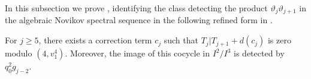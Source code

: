 

In this subsection we prove , identifying the class detecting the product $\vartheta_j\vartheta_{j+1}$ in the algebraic Novikov spectral sequence in the following refined form in .

\begin{lem} \label{lem:prod-big}
  For $j \geq 5$, there exists a correction term $c_j$ such that $T_j|T_{j+1} + d(c_j)$ is zero modulo $(4, v_1^4)$.
  Moreover, the image of this cocycle in $I^2/I^3$ is detected by $q_0^2g_{j-2}$.
\end{lem}




